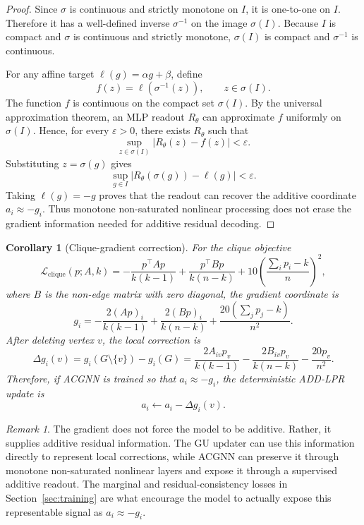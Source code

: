 \documentclass[11pt]{article}
\theoremstyle{plain}
\newtheorem{corollary}[theorem]{Corollary}
\theoremstyle{definition}
\theoremstyle{remark}
\newtheorem{remark}[theorem]{Remark}
\begin{document}
\begin{proof}
  Since \(\sigma\) is continuous and strictly monotone on \(I\), it is one-to-one on
  \(I\). Therefore it has a well-defined inverse \(\sigma^{-1}\) on the image
  \(\sigma(I)\). Because \(I\) is compact and \(\sigma\) is continuous and strictly
  monotone, \(\sigma(I)\) is compact and \(\sigma^{-1}\) is continuous.

  For any affine target \(\ell(g)=\alpha g+\beta\), define
  \[
    f(z)=\ell(\sigma^{-1}(z)),
    \qquad z\in \sigma(I).
  \]
  The function \(f\) is continuous on the compact set \(\sigma(I)\). By the universal
  approximation theorem, an MLP readout \(R_\theta\) can approximate \(f\) uniformly
  on \(\sigma(I)\). Hence, for every \(\varepsilon>0\), there exists \(R_\theta\) such
  that
  \[
    \sup_{z\in \sigma(I)}
    |R_\theta(z)-f(z)|<\varepsilon .
  \]
  Substituting \(z=\sigma(g)\) gives
  \[
    \sup_{g\in I}
    \left|
    R_\theta(\sigma(g))-\ell(g)
    \right|
    <\varepsilon .
  \]
  Taking \(\ell(g)=-g\) proves that the readout can recover the additive coordinate
  \(a_i\approx -g_i\). Thus monotone non-saturated nonlinear processing does not erase
  the gradient information needed for additive residual decoding.
\end{proof}

\begin{corollary}[Clique-gradient correction]
  \label{cor:clique_gradient}
  For the clique objective
  \[
    \mathcal{L}_{\mathrm{clique}}(p;A,k)
    =
    -\frac{p^\top A p}{k(k-1)}
    +
    \frac{p^\top B p}{k(n-k)}
    +
    10\left(\frac{\sum_i p_i-k}{n}\right)^2 ,
  \]
  where \(B\) is the non-edge matrix with zero diagonal, the gradient coordinate is
  \[
    g_i
    =
    -\frac{2(Ap)_i}{k(k-1)}
    +
    \frac{2(Bp)_i}{k(n-k)}
    +
    \frac{20(\sum_j p_j-k)}{n^2}.
  \]
  After deleting vertex \(v\), the local correction is
  \[
    \Delta g_i(v)
    =
    g_i(G\setminus\{v\})-g_i(G)
    =
    \frac{2A_{iv}p_v}{k(k-1)}
    -
    \frac{2B_{iv}p_v}{k(n-k)}
    -
    \frac{20p_v}{n^2}.
  \]
  Therefore, if ACGNN is trained so that \(a_i\approx -g_i\), the deterministic
  ADD-LPR update is
  \[
    a_i \leftarrow a_i-\Delta g_i(v).
  \]
\end{corollary}

\begin{remark}
  The gradient does not force the model to be additive. Rather, it supplies additive
  residual information. The GU updater can use this information directly to represent
  local corrections, while ACGNN can preserve it through monotone non-saturated
  nonlinear layers and expose it through a supervised additive readout. The marginal
  and residual-consistency losses in Section~\ref{sec:training} are what encourage
  the model to actually expose this representable signal as \(a_i\approx -g_i\).
\end{remark}
\end{document}
